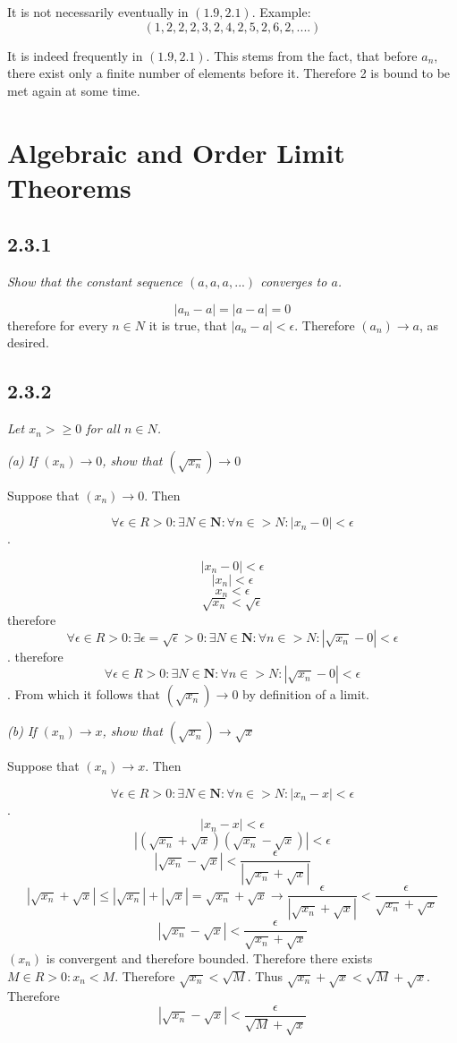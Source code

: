 \documentclass[11pt,oneside,titlepage]{book}
\begin{document}
It is not necessarily eventually  in $(1.9, 2.1)$. Example:
$$(1, 2, 2, 2, 3, 2, 4, 2, 5, 2, 6, 2, ....)$$

It is indeed frequently in $(1.9, 2.1)$. This stems from the fact, that before $a_n$,
there exist only a finite number of elements before it. Therefore 2 is bound to
be met again at some time.

\section{Algebraic and Order Limit Theorems}

\subsection*{2.3.1}
\textit{Show that the constant sequence $(a, a, a, ...)$ converges to $a$.}

$$|a_n - a| = |a - a| = 0$$
therefore for every $n \in N$ it is true, that $|a_n - a| < \epsilon$.
Therefore $(a_n) \to a$, as desired.

\subsection*{2.3.2}
\textit{Let $x_n >\geq 0$ for all $n \in N$.}

\textit{(a) If $(x_n) \to 0$, show that $(\sqrt{x_n}) \to 0$}

Suppose that $(x_n) \to 0$. Then

$$\forall \epsilon \in R > 0: \exists N \in \textbf{N}: \forall n \in  > N:
|x_n - 0| < \epsilon$$.

$$|x_n - 0| < \epsilon$$
$$|x_n| < \epsilon$$
$$x_n < \epsilon$$
$$\sqrt{x_n} < \sqrt{\epsilon}$$
therefore
$$\forall \epsilon \in R > 0: \exists \epsilon = \sqrt{\epsilon} > 0:
\exists N \in \textbf{N}: \forall n \in  > N: |\sqrt{x_n} - 0| < \epsilon$$.
therefore
$$\forall \epsilon \in R > 0: 
\exists N \in \textbf{N}: \forall n \in  > N: |\sqrt{x_n} - 0| < \epsilon$$.
From which it follows that $(\sqrt{x_n}) \to 0$ by definition of a limit.

\textit{(b) If $(x_n) \to x$, show that $(\sqrt{x_n}) \to \sqrt{x}$}

Suppose that $(x_n) \to x$. Then

$$\forall \epsilon \in R > 0: \exists N \in \textbf{N}: \forall n \in  > N:
|x_n - x| < \epsilon$$.
$$|x_n - x|  < \epsilon$$
$$|(\sqrt{x_n} + \sqrt{x})(\sqrt{x_n} - \sqrt{x})|  < \epsilon$$
$$|\sqrt{x_n} - \sqrt{x}|  < \frac{\epsilon}{|\sqrt{x_n} + \sqrt{x}|}$$
$$ |\sqrt{x_n} + \sqrt{x}| \leq |\sqrt{x_n}| + |\sqrt{x}| = \sqrt{x_n} +
\sqrt{x} \to \frac{\epsilon}{|\sqrt{x_n} + \sqrt{x}|} <
\frac{\epsilon}{\sqrt{x_n} + \sqrt{x}}$$
$$|\sqrt{x_n} - \sqrt{x}|  < \frac{\epsilon}{\sqrt{x_n} + \sqrt{x}}$$
$(x_n)$ is convergent and therefore bounded. Therefore there exists
$M \in R > 0: x_n < M$. Therefore $\sqrt{x_n} < \sqrt{M}$. Thus
$\sqrt{x_n} + \sqrt{x} < \sqrt{M} + \sqrt{x}$. Therefore
$$|\sqrt{x_n} - \sqrt{x}|  < \frac{\epsilon}{\sqrt{M} + \sqrt{x}}$$
\end{document}
